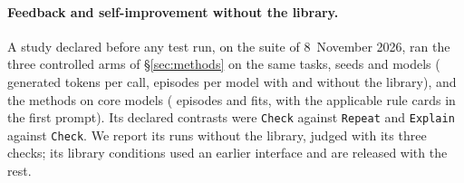 \paragraph{Feedback and self-improvement without the library.}
A study declared before any test run, on the suite of 8~November 2026, ran the three controlled
arms of \S\ref{sec:methods} on the same tasks, seeds and models (\StudyOutputCap{} generated
tokens per call, \StudyPEpisodes{} episodes per model with and without the library), and the
\NMethods{} methods on \StudyCoreModels{} core models (\StudySEpisodes{} episodes and
\StudySFits{} fits, with the applicable rule cards in the first prompt). Its declared contrasts
were \texttt{Check} against \texttt{Repeat} and \texttt{Explain} against \texttt{Check}. We
report its runs without the library, judged with its three checks; its library conditions used
an earlier interface and are released with the rest.
